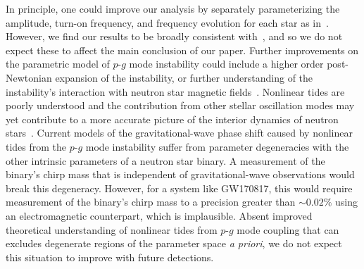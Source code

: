 In principle, one could improve our analysis by separately parameterizing the amplitude, turn-on frequency, and frequency evolution for each star as in~\cite{abbott2019constraining}. However, we find our results to be broadly consistent with~\cite{abbott2019constraining}, and so we do not expect these to affect the main conclusion of our paper. Further improvements on the  parametric model of $p$-$g$ mode instability could include a higher order post-Newtonian expansion of the instability, or further understanding of the instability's interaction with neutron star magnetic fields~\citep{Weinberg:2015pxa}. Nonlinear tides are poorly understood and the contribution from other stellar oscillation modes may yet contribute to a more accurate picture of the interior dynamics of neutron stars~\citep{Andersson:2017iav}. Current models of the gravitational-wave phase shift caused by nonlinear tides from the $p$-$g$ mode instability  suffer from parameter degeneracies with the other intrinsic parameters of a neutron star binary. A measurement of the binary's chirp mass that is independent of gravitational-wave observations would break this degeneracy. However, for a system like GW170817, this would require measurement of the binary's chirp mass to a precision greater than $\sim 0.02 \%$ using an electromagnetic counterpart, which is implausible. Absent improved theoretical understanding of  nonlinear tides from $p$-$g$ mode coupling that can excludes degenerate regions of the parameter space \emph{a priori}, we do not expect this situation to improve with future detections.

